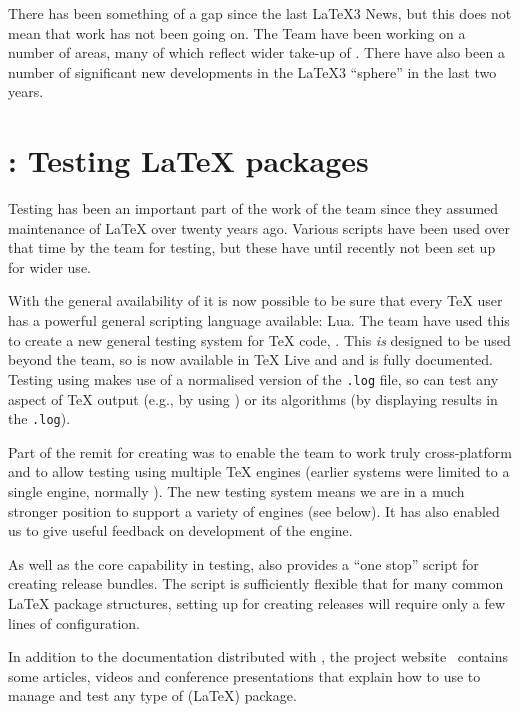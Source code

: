 \documentclass{ltnews}
\begin{document}
\maketitle

There has been something of a gap since the last \LaTeX3 News, but this does
not mean that work has not been going on. The Team have been working on a
number of areas, many of which reflect wider take-up of . There have
also been a number of significant new developments in the \LaTeX3
\enquote{sphere} in the last two years.

\section{: Testing \LaTeX{} packages}

Testing has been an important part of the work of the team since they assumed
maintenance of \LaTeX{} over twenty years ago. Various scripts have been used
over that time by the team for testing, but these have until recently not been
set up for wider use.

With the general availability of  it is now possible to be sure
that every \TeX{} user has a powerful general scripting language available:
Lua. The team have used this to create a new general testing system for \TeX{}
code, . This \emph{is} designed to be used beyond the team, so is
now available in \TeX{} Live and  and is fully documented.
Testing using  makes use of a normalised version of the
\texttt{.log} file, so can test any aspect of \TeX{} output (e.g., by using
) or its algorithms (by displaying results in the \texttt{.log}).

Part of the remit for creating  was to enable the team to work
truly cross-platform and to allow testing using multiple \TeX{} engines
(earlier systems were limited to a single engine, normally \eTeX{}). The new
testing system means we are in a much stronger position to support a variety of
engines (see below). It has also enabled us to give useful feedback on
development of the  engine.

As well as the core capability in testing,  also provides a
\enquote{one stop} script for creating release bundles. The script is
sufficiently flexible that for many common \LaTeX{} package structures, setting
up for creating releases will require only a few lines of configuration.

In addition to the documentation distributed with , the project
website~\cite[publications in 2014]{project-publications} contains some
articles, videos and conference presentations that explain how to use
 to manage and test any type of (\LaTeX{}) package.
\end{document}
